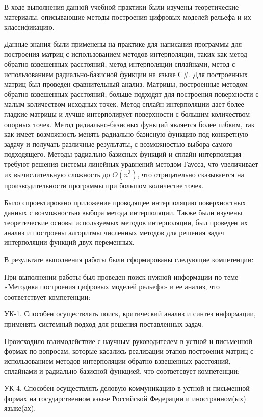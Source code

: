 \conclusion
В ходе выполнения данной учебной практики были изучены теоретические материалы, описывающие методы построения цифровых моделей рельефа и их классификацию.

Данные знания были применены на практике для написания программы для построения матриц с использованием методов интерполяции, таких как метод обратно взвешенных расстояний, метод интерполяции сплайнами, метод с использованием радиально-базисной функции на языке С\#. Для построенных матриц был проведен сравнительный анализ. Матрицы, построенные методом обратно взвешенных расстояний, больше подходят для построения поверхности с малым количеством исходных точек. Метод сплайн интерполяции дает более гладкие матрицы и лучше интерполирует поверхности с большим количеством опорных точек. Метод радиально-базисных функций является более гибким, так как имеет возможность менять радиально-базисную функцию под конкретную задачу и получать различные результаты, с возможностью выбора самого подходящего. Методы радиально-базисных функций и сплайн интерполяция требуют решения системы линейных уравнений методом Гаусса, что увеличивает их вычислительную сложность до $O(n^3)$, что отрицательно сказывается на производительности программы при большом количестве точек.

Было спроектировано приложение проводящее интерполяцию поверхностных данных с возможностью выбора метода интерполяции. Также были изучены теоретические основы используемых методов интерполяции, был проведен их анализ и построены алгоритмы численных методов для решения задач интерполяции функций двух переменных. 

В результате выполнения работы были сформированы следующие компетенции:

При выполнении работы был проведен поиск нужной информации по теме «Методика построения цифровых моделей рельефа» и ее анализ, что соответствует компетенции: 

УК-1. Способен осуществлять поиск, критический анализ и синтез
информации, применять системный подход для решения поставленных
задач.

Происходило взаимодействие с научным руководителем в устной и письменной формах по вопросам, которые касались реализации этапов построения матриц с использованием методов интерполяции обратно взвешенных расстояний, сплайнами и радиально-базисной функцией, что соответсвует компетенции:

УК-4. Способен осуществлять деловую коммуникацию в устной и
письменной формах на государственном языке Российской
Федерации и иностранном(ых) языке(ах).

